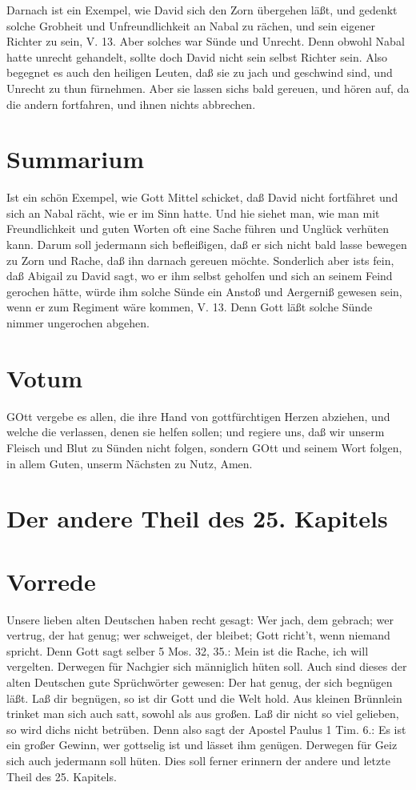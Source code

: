 Darnach ist ein Exempel, wie David sich den Zorn übergehen läßt, und gedenkt solche Grobheit und Unfreundlichkeit an Nabal zu rächen, und sein eigener Richter zu sein, V. 13. Aber solches war Sünde und Unrecht. Denn obwohl Nabal hatte unrecht gehandelt, sollte doch David nicht sein selbst Richter sein. Also begegnet es auch den heiligen Leuten, daß sie zu jach und geschwind sind, und Unrecht zu thun fürnehmen. Aber sie lassen sichs bald gereuen, und hören auf, da die andern fortfahren, und ihnen nichts abbrechen.

\section{Summarium}

Ist ein schön Exempel, wie Gott Mittel schicket, daß David nicht fortfähret und sich an Nabal rächt, wie er im Sinn hatte. Und hie siehet man, wie man mit Freundlichkeit und guten Worten oft eine Sache führen und Unglück verhüten kann. Darum soll jedermann sich befleißigen, daß er sich nicht bald lasse bewegen zu Zorn und Rache, daß ihn darnach gereuen möchte. Sonderlich aber ists fein, daß Abigail zu David sagt, wo er ihm selbst geholfen und sich an seinem Feind gerochen hätte, würde ihm solche Sünde ein Anstoß und Aergerniß gewesen
sein, wenn er zum Regiment wäre kommen, V. 13. Denn Gott läßt solche Sünde nimmer ungerochen abgehen.

\section{Votum}

GOtt vergebe es allen, die ihre Hand von gottfürchtigen Herzen abziehen, und welche die verlassen, denen sie helfen sollen; und regiere uns, daß wir unserm Fleisch und Blut zu Sünden nicht folgen, sondern GOtt und seinem Wort folgen, in allem Guten, unserm Nächsten zu Nutz, Amen.

\section{Der andere Theil des 25. Kapitels}

\section{Vorrede}

Unsere lieben alten Deutschen haben recht gesagt: Wer jach, dem gebrach; wer vertrug, der hat genug; wer schweiget, der bleibet; Gott richt't, wenn niemand spricht. Denn Gott sagt selber 5 Mos. 32, 35.: Mein ist die Rache, ich will vergelten. Derwegen für Nachgier sich männiglich hüten soll. Auch sind dieses der alten Deutschen gute Sprüchwörter gewesen: Der hat genug, der sich begnügen läßt. Laß dir begnügen, so ist dir Gott und die Welt hold. Aus kleinen Brünnlein trinket man sich auch satt, sowohl als aus großen. Laß dir nicht so viel gelieben, so wird dichs nicht betrüben. Denn also sagt der Apostel Paulus 1 Tim. 6.: Es ist ein großer Gewinn, wer gottselig ist und lässet ihm genügen. Derwegen für Geiz sich auch jedermann soll hüten. Dies soll ferner erinnern der andere und letzte Theil des 25. Kapitels.

